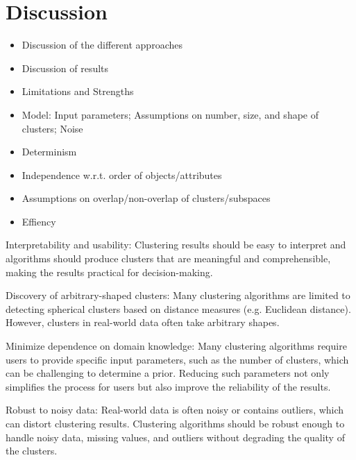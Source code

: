 \section{Discussion}
\begin{itemize}
    \item Discussion of the different approaches
    \item Discussion of results
    \item Limitations and Strengths
    \item Model: Input parameters; Assumptions on number, size, and shape of clusters; Noise
    \item Determinism
    \item Independence w.r.t. order of objects/attributes
    \item Assumptions on overlap/non-overlap of clusters/subspaces
    \item Effiency
\end{itemize}


Interpretability and usability: Clustering results should be easy to interpret and algorithms should produce clusters that are meaningful and comprehensible, making the results practical for decision-making.

Discovery of arbitrary-shaped clusters: Many clustering algorithms are limited to detecting spherical clusters based on distance measures (e.g. Euclidean distance). However, clusters in real-world data often take arbitrary shapes.

Minimize dependence on domain knowledge: Many clustering algorithms require users to provide specific input parameters, such as the number of clusters, which can be challenging to determine a prior. Reducing such parameters not only simplifies the process for users but also improve the reliability of the results.

Robust to noisy data: Real-world data is often noisy or contains outliers, which can distort clustering results. Clustering algorithms should be robust enough to handle noisy data, missing values, and outliers without degrading the quality of the clusters.

\cite[p.~446-447]{han-2011}